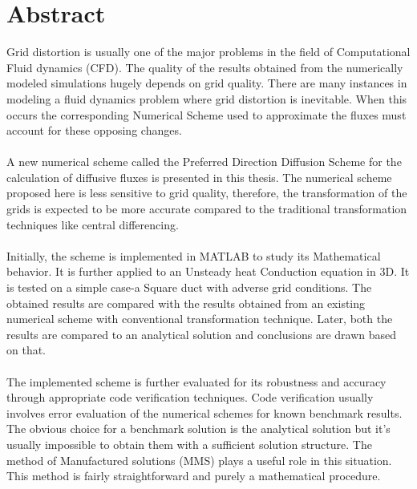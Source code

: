 
\thispagestyle{plain}            %
\setlength{\parskip}{0pt plus 1.0pt}
\section*{Abstract}
\hspace{0.25cm}Grid distortion is usually one of the major problems in the field of Computational Fluid dynamics (CFD). The quality of the results obtained from the numerically modeled simulations hugely depends on grid quality. There are many instances in modeling a fluid dynamics problem where grid distortion is inevitable. When this occurs the corresponding Numerical Scheme used to approximate the fluxes must account for these opposing changes. \\
\\
\hspace{0.25cm}A new numerical scheme called the Preferred Direction Diffusion Scheme for the calculation of diffusive fluxes is presented in this thesis. The numerical scheme proposed here is less sensitive to grid quality, therefore, the transformation of the grids is expected to be more accurate compared to the traditional transformation techniques like central differencing.\\
\\
\hspace{0.25cm}Initially, the scheme is implemented in MATLAB to study its Mathematical behavior. It is further applied to an Unsteady heat Conduction equation in 3D. It is tested on a simple case-a Square duct with adverse grid conditions. The obtained results are compared with the results obtained from an existing numerical scheme with conventional transformation technique. Later, both the results are compared to an analytical solution and conclusions are drawn based on that. \\
\\
\hspace{0.25cm}The implemented scheme is further evaluated for its robustness and accuracy through appropriate code verification techniques. Code verification usually involves error evaluation of the numerical schemes for known benchmark results. The obvious choice for a benchmark solution is the analytical solution but it's usually impossible to obtain them with a sufficient solution structure. The method of Manufactured solutions (MMS) plays a useful role in this situation. This method is fairly straightforward and purely a mathematical procedure. \\
